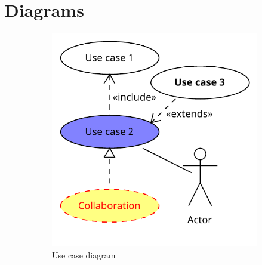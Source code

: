 \documentclass[10pt,twocolumn,twoside,slovak,a4paper]{article}
\begin{document}
\section{Diagrams} \label{dolezitejsia}

\begin{figure}[htbp]
    \centering
    \begin{subfigure}[b]{0.45\textwidth}
        \centering
        \includegraphics[width=\textwidth]{Diagrams/Diagram.pdf}
        \caption{Use case diagram}
        \label{fig:collaborative_filtering}
    \end{subfigure}
    \hfill
    \begin{subfigure}[b]{0.45\textwidth}
        \centering

\end{subfigure}
\end{figure}
\end{document}
